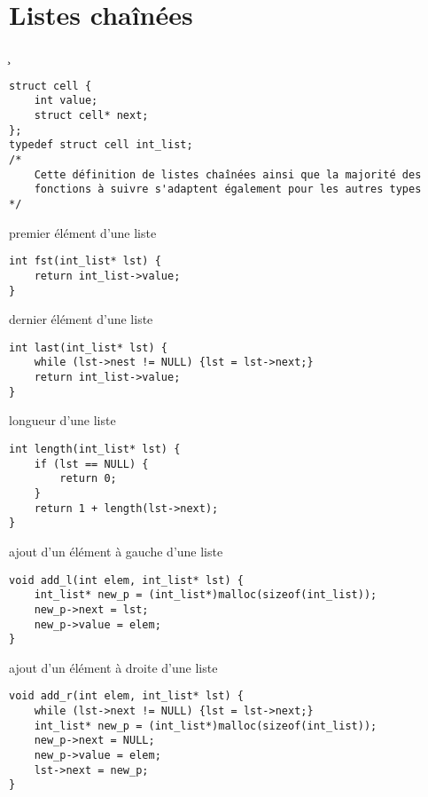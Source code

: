 \section{Listes chaînées}
\c
\begin{tp*}{}
\begin{verbatim}
struct cell {
    int value;
    struct cell* next;
};
typedef struct cell int_list;
/*
    Cette définition de listes chaînées ainsi que la majorité des
    fonctions à suivre s'adaptent également pour les autres types
*/
\end{verbatim}
\end{tp*}
\begin{fnc*}{premier élément d'une liste}
\begin{verbatim}
int fst(int_list* lst) {
    return int_list->value;
}
\end{verbatim}
\end{fnc*}
\begin{fnc*}{dernier élément d'une liste}
\begin{verbatim}
int last(int_list* lst) {
    while (lst->nest != NULL) {lst = lst->next;}
    return int_list->value;
}
\end{verbatim}
\end{fnc*}
\begin{fnc*}{longueur d'une liste}
\begin{verbatim}
int length(int_list* lst) {
    if (lst == NULL) {
        return 0;
    }
    return 1 + length(lst->next);
}
\end{verbatim}
\end{fnc*}
\begin{fnc*}{ajout d'un élément à gauche d'une liste}
\begin{verbatim}
void add_l(int elem, int_list* lst) {
    int_list* new_p = (int_list*)malloc(sizeof(int_list));
    new_p->next = lst;
    new_p->value = elem;
}
\end{verbatim}
\end{fnc*}
\begin{fnc*}{ajout d'un élément à droite d'une liste}
\begin{verbatim}
void add_r(int elem, int_list* lst) {
    while (lst->next != NULL) {lst = lst->next;}
    int_list* new_p = (int_list*)malloc(sizeof(int_list));
    new_p->next = NULL;
    new_p->value = elem;
    lst->next = new_p;
}
\end{verbatim}
\end{fnc*}
